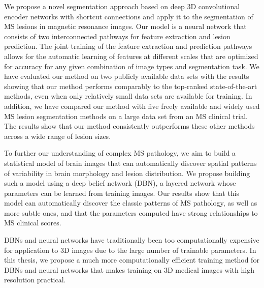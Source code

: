 We propose a novel segmentation approach based on deep 3D convolutional encoder
networks with shortcut connections and apply it to the segmentation of MS
lesions in magnetic resonance images. Our model is a neural network that
consists of two interconnected pathways for feature extraction and lesion
prediction. The joint training of the feature extraction and prediction pathways
allows for the automatic learning of features at different scales that are
optimized for accuracy for any given combination of image types and segmentation
task. We have evaluated our method on two publicly available data sets with the
results showing that our method performs comparably to the top-ranked
state-of-the-art methods, even when only relatively small data sets are
available for training. In addition, we have compared our method with five
freely available and widely used MS lesion segmentation methods on a large data
set from an MS clinical trial. The results show that our method consistently
outperforms these other methods across a wide range of lesion sizes.

To further our understanding of complex MS pathology, we aim to build a
statistical model of brain images that can automatically discover spatial
patterns of variability in brain morphology and lesion distribution. We propose
building such a model using a deep belief network (DBN), a layered network whose
parameters can be learned from training images.
%
%
Our results show that this model can automatically discover the
classic patterns of MS pathology, as well as more subtle ones, and that the
parameters computed have strong relationships to MS clinical scores.

DBNs and neural networks have traditionally been too computationally expensive
for application to 3D images due to the large number of trainable parameters. In
this thesis, we propose a much more computationally efficient training method
for DBNs and neural networks that makes training on 3D medical images with high
resolution practical.

